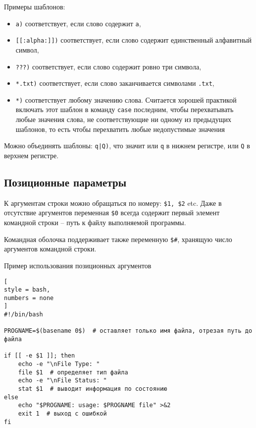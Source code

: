 \documentclass[%
	11pt,
	a4paper,
	utf8,
		]{article}
\begin{document}
Примеры шаблонов:
\begin{itemize}
	\item \verb|a)| соответствует, если слово содержит \texttt{a},
	
	\item \verb|[[:alpha:]])| соответствует, если слово содержит единственный алфавитный символ,
	
	\item \verb|???)| соответствует, если слово содержит ровно три символа,
	
	\item \verb|*.txt)| соответствует, если слово заканчивается символами \texttt{.txt},
	
	\item \verb|*)| соответствует любому значению слова. Считается хорошей практикой включать этот шаблон в команду \texttt{case} последним, чтобы перехватывать любые значения слова, не соответствующие ни одному из предыдущих шаблонов, то есть чтобы перехватить любые недопустимые значения
\end{itemize}

Можно объединять шаблоны: \lstinline[basicstyle=\ttfamily\fontsize{10pt}{10pt}]{q|Q)}, что значит или \texttt{q} в нижнем регистре, или \texttt{Q} в верхнем регистре.

\subsection{Позиционные параметры}

К аргументам строки можно обращаться по номеру: \verb|$1, $2| etc. Даже в отсутствие аргументов переменная \verb|$0| всегда содержит первый элемент командной строки -- путь к файлу выполняемой программы.


Командная оболочка поддерживает также переменную \verb|$#|, хранящую число аргументов командной строки.

Пример использования позиционных аргументов
\begin{lstlisting}[
style = bash,
numbers = none
]
#!/bin/bash

PROGNAME=$(basename 0$)  # оставляет только имя файла, отрезая путь до файла

if [[ -e $1 ]]; then
    echo -e "\nFile Type: "
    file $1  # определяет тип файла
    echo -e "\nFile Status: "
    stat $1  # выводит информация по состоянию
else
    echo "$PROGNAME: usage: $PROGNAME file" >&2
    exit 1  # выход с ошибкой
fi
\end{lstlisting}
\end{document}
